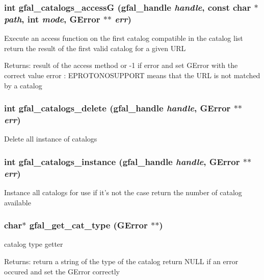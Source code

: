 \subsubsection{\setlength{\rightskip}{0pt plus 5cm}int gfal\_\-catalogs\_\-access\-G (gfal\_\-handle {\em handle}, const char $\ast$ {\em path}, int {\em mode}, GError $\ast$$\ast$ {\em err})}\label{gfal__common__catalog_8h_4fd85b35f2134b73207c12b54e85959d}


Execute an access function on the first catalog compatible in the catalog list return the result of the first valid catalog for a given URL \begin{Desc}
\item[Returns:]result of the access method or -1 if error and set GError with the correct value error : EPROTONOSUPPORT means that the URL is not matched by a catalog \end{Desc}
\subsubsection{\setlength{\rightskip}{0pt plus 5cm}int gfal\_\-catalogs\_\-delete (gfal\_\-handle {\em handle}, GError $\ast$$\ast$ {\em err})}\label{gfal__common__catalog_8h_405974336e7b4ebaafeea02577d7d4d5}


Delete all instance of catalogs 
\subsubsection{\setlength{\rightskip}{0pt plus 5cm}int gfal\_\-catalogs\_\-instance (gfal\_\-handle {\em handle}, GError $\ast$$\ast$ {\em err})}\label{gfal__common__catalog_8h_d272f75eb549a72064524ecce3c25fe7}


Instance all catalogs for use if it's not the case return the number of catalog available 
\subsubsection{\setlength{\rightskip}{0pt plus 5cm}char$\ast$ gfal\_\-get\_\-cat\_\-type (GError $\ast$$\ast$)}\label{gfal__common__catalog_8h_791ad55a9c8aaca0bb8ae74a3538c202}


catalog type getter 

\begin{Desc}
\item[Returns:]return a string of the type of the catalog return NULL if an error occured and set the GError correctly \end{Desc}
